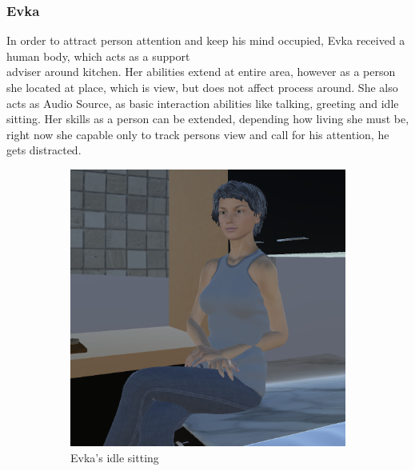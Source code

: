 \documentclass[18pt]{article}
\numberwithin{equation}{section} %
\numberwithin{figure}{section} %
\numberwithin{table}{section} %
\begin{document}
	\subsubsection{Evka}
	In order to attract person attention and keep his mind occupied, Evka received a human body, which acts as a support\\adviser around kitchen. Her abilities extend at entire area, however as a person she located at place, which is  view, but does not affect process around. She also acts as Audio Source, as basic interaction abilities like talking, greeting and idle sitting. Her skills as a person can be extended, depending how living she must be, right now she capable only to track persons view and call for his attention, he gets distracted. \\
	\begin{figure}[H]
		\centering
		\begin{subfigure}{0.4\textwidth}
			\centering
			\includegraphics[width=1\linewidth]{images/Evka_sit_1}
			\caption{Evka's idle sitting}
		\end{subfigure}
		\begin{subfigure}{0.4\textwidth}
			\centering

\end{subfigure}
\end{figure}
\end{document}
